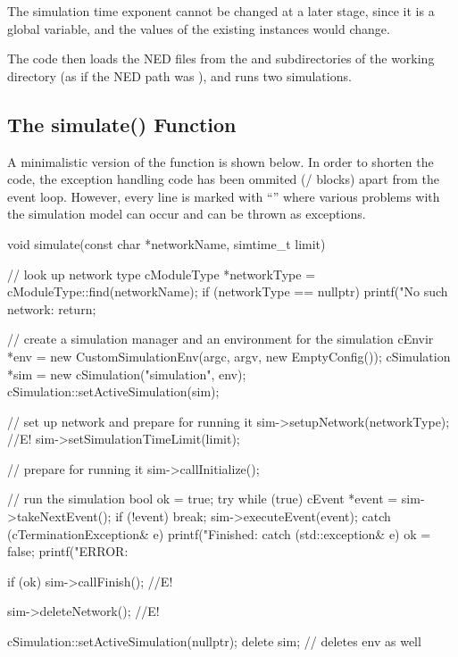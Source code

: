 \begin{note}
The simulation time exponent cannot be changed at a later stage, since it is
a global variable, and the values of the existing  instances
would change.
\end{note}

The code then loads the NED files from the  and
 subdirectories of the working directory (as if the NED path
was ), and runs two simulations.


\subsection{The simulate() Function}
\label{sec:embedding:simulate-function}

A minimalistic version of the  function is shown below.
In order to shorten the code, the exception handling code has been ommited (/ blocks)
apart from the event loop. However, every line is marked with ``'' where various
problems with the simulation model can occur and can be thrown as exceptions.

\begin{cpp}
void simulate(const char *networkName, simtime_t limit)
{
    // look up network type
    cModuleType *networkType = cModuleType::find(networkName);
    if (networkType == nullptr) {
        printf("No such network: %
        return;
    }

    // create a simulation manager and an environment for the simulation
    cEnvir *env = new CustomSimulationEnv(argc, argv, new EmptyConfig());
    cSimulation *sim = new cSimulation("simulation", env);
    cSimulation::setActiveSimulation(sim);

    // set up network and prepare for running it
    sim->setupNetwork(networkType); //E!
    sim->setSimulationTimeLimit(limit);

    // prepare for running it
    sim->callInitialize();

    // run the simulation
    bool ok = true;
    try {
        while (true) {
            cEvent *event = sim->takeNextEvent();
            if (!event)
                break;
            sim->executeEvent(event);
        }
    }
    catch (cTerminationException& e) {
        printf("Finished: %
    }
    catch (std::exception& e) {
        ok = false;
        printf("ERROR: %
    }

    if (ok)
        sim->callFinish();  //E!

    sim->deleteNetwork();  //E!

    cSimulation::setActiveSimulation(nullptr);
    delete sim; // deletes env as well
}
\end{cpp}


